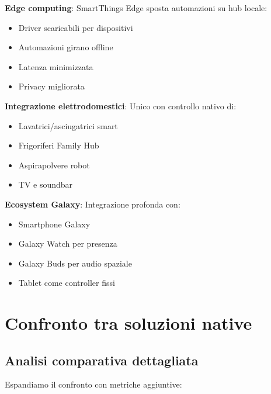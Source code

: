 \textbf{Edge computing}: SmartThings Edge sposta automazioni su hub locale:
\begin{itemize}
    \item Driver scaricabili per dispositivi
    \item Automazioni girano offline
    \item Latenza minimizzata
    \item Privacy migliorata
\end{itemize}

\textbf{Integrazione elettrodomestici}: Unico con controllo nativo di:
\begin{itemize}
    \item Lavatrici/asciugatrici smart
    \item Frigoriferi Family Hub
    \item Aspirapolvere robot
    \item TV e soundbar
\end{itemize}

\textbf{Ecosystem Galaxy}: Integrazione profonda con:
\begin{itemize}
    \item Smartphone Galaxy
    \item Galaxy Watch per presenza
    \item Galaxy Buds per audio spaziale
    \item Tablet come controller fissi
\end{itemize}

\cite{Samsung2023}

\section{Confronto tra soluzioni native}

\subsection{Analisi comparativa dettagliata}

Espandiamo il confronto con metriche aggiuntive:

